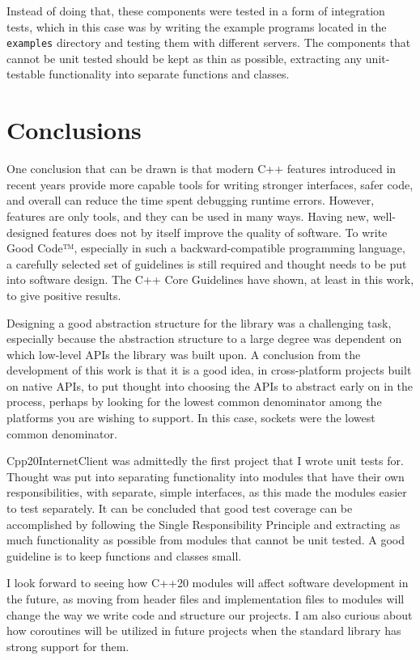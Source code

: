 \documentclass[12pt, a4paper]{article}
\begin{document}
Instead of doing that, these components were tested in a form of integration tests, which in this case was by writing the example programs located in the \texttt{examples} directory and testing them with different servers. The components that cannot be unit tested should be kept as thin as possible, extracting any unit-testable functionality into separate functions and classes.

\clearpage
\section{Conclusions}
One conclusion that can be drawn is that modern C++ features introduced in recent years provide more capable tools for writing stronger interfaces, safer code, and overall can reduce the time spent debugging runtime errors. However, features are only tools, and they can be used in many ways. Having new, well-designed features does not by itself improve the quality of software. To write Good Code™, especially in such a backward-compatible programming language, a carefully selected set of guidelines is still required and thought needs to be put into software design. The C++ Core Guidelines have shown, at least in this work, to give positive results.

Designing a good abstraction structure for the library was a challenging task, especially because the abstraction structure to a large degree was dependent on which low-level APIs the library was built upon. A conclusion from the development of this work is that it is a good idea, in cross-platform projects built on native APIs, to put thought into choosing the APIs to abstract early on in the process, perhaps by looking for the lowest common denominator among the platforms you are wishing to support. In this case, sockets were the lowest common denominator.

Cpp20InternetClient was admittedly the first project that I wrote unit tests for. Thought was put into separating functionality into modules that have their own responsibilities, with separate, simple interfaces, as this made the modules easier to test separately. It can be concluded that good test coverage can be accomplished by following the Single Responsibility Principle and extracting as much functionality as possible from modules that cannot be unit tested. A good guideline is to keep functions and classes small.

I look forward to seeing how C++20 modules will affect software development in the future, as moving from header files and implementation files to modules will change the way we write code and structure our projects. I am also curious about how coroutines will be utilized in future projects when the standard library has strong support for them.

\clearpage
\printbibliography
\end{document}
